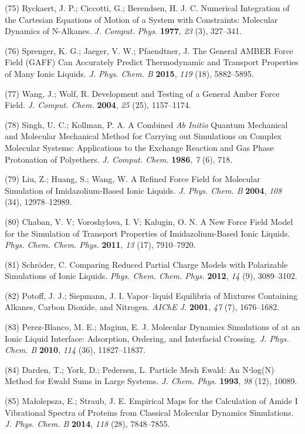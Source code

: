 (75) Ryckaert, J. P.; Ciccotti, G.; Berendsen, H. J. C. Numerical Integration of the Cartesian Equations of Motion of a System with Constraints: Molecular Dynamics of N-Alkanes. \emph{J. Comput. Phys.}  \textbf{1977}, \emph{23} (3), 327--341.

(76) Sprenger, K. G.; Jaeger, V. W.; Pfaendtner, J. The General AMBER Force Field (GAFF) Can Accurately Predict Thermodynamic and Transport Properties of Many Ionic Liquids. \emph{J. Phys. Chem. B} \textbf{2015}, \emph{119} (18), 5882--5895.

(77) Wang, J.; Wolf, R. Development and Testing of a General Amber Force Field. \emph{J. Comput. Chem.} \textbf{2004}, \emph{25} (25), 1157--1174.

(78) Singh, U. C.; Kollman, P. A. A Combined \emph{Ab Initio} Quantum Mechanical and Molecular Mechanical Method for Carrying out Simulations on Complex Molecular Systems: Applications to the  Exchange Reaction and Gas Phase Protonation of Polyethers. \emph{J. Comput. Chem.} \textbf{1986}, \emph{7} (6), 718.

(79) Liu, Z.; Huang, S.; Wang, W. A Refined Force Field for Molecular Simulation of Imidazolium-Based Ionic Liquids. \emph{J. Phys. Chem. B} \textbf{2004}, \emph{108} (34), 12978--12989.

(80) Chaban, V. V; Voroshylova, I. V; Kalugin, O. N. A New Force Field Model for the Simulation of Transport Properties of Imidazolium-Based Ionic Liquids. \emph{Phys. Chem. Chem. Phys.} \textbf{2011}, \emph{13} (17), 7910--7920.

(81) Schröder, C. Comparing Reduced Partial Charge Models with Polarizable Simulations of Ionic Liquids. \emph{Phys. Chem. Chem. Phys.}  \textbf{2012}, \emph{14} (9), 3089--3102.

(82) Potoff, J. J.; Siepmann, J. I. Vapor--liquid Equilibria of Mixtures Containing Alkanes, Carbon Dioxide, and Nitrogen. \emph{AIChE J.}  \textbf{2001}, \emph{47} (7), 1676--1682.

(83) Perez-Blanco, M. E.; Maginn, E. J. Molecular Dynamics Simulations of  at an Ionic Liquid Interface: Adsorption, Ordering, and Interfacial Crossing. \emph{J. Phys. Chem. B} \textbf{2010}, \emph{114} (36), 11827--11837.

(84) Darden, T.; York, D.; Pedersen, L. Particle Mesh Ewald: An N⋅log(N) Method for Ewald Sums in Large Systems. \emph{J. Chem. Phys.}  \textbf{1993}, \emph{98} (12), 10089.

(85) Małolepsza, E.; Straub, J. E. Empirical Maps for the Calculation of Amide I Vibrational Spectra of Proteins from Classical Molecular Dynamics Simulations. \emph{J. Phys. Chem. B} \textbf{2014}, \emph{118} (28), 7848--7855.

